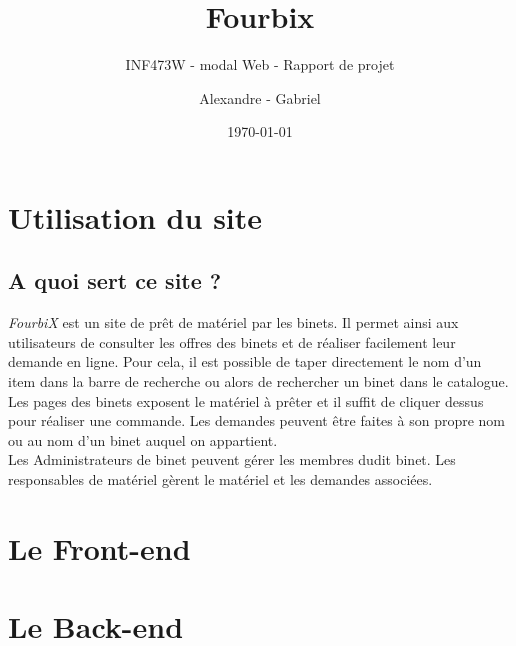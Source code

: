 \documentclass[titlepage,11pt,a4paper]{article}
\title{Fourbix}
\subtitle{INF473W - modal Web - Rapport de projet}
\author{Alexandre \bsc{Binninger} - Gabriel \bsc{Oliveira Martins}}
\date{\today}
\begin{document}
\maketitle

\clearpage

\setcounter{page}{1}

\section{Utilisation du site}

\subsection{A quoi sert ce site ?}

\emph{FourbiX} est un site de prêt de matériel par les binets. Il permet ainsi aux utilisateurs de consulter les offres des binets et de réaliser facilement leur demande en ligne. Pour cela, il est possible de taper directement le nom d'un item dans la barre de recherche ou alors de rechercher un binet dans le catalogue. Les pages des binets exposent le matériel à prêter et il suffit de cliquer dessus pour réaliser une commande. Les demandes peuvent être faites à son propre nom ou au nom d'un binet auquel on appartient.\\

Les Administrateurs de binet peuvent gérer les membres dudit binet. Les responsables de matériel gèrent le matériel et les demandes associées. 

\section{Le Front-end}

\section{Le Back-end}
\end{document}
